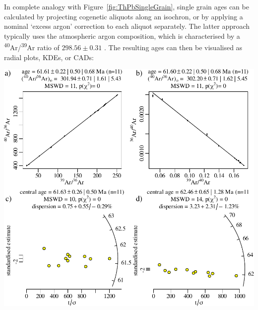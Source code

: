 \begin{refsection}
In complete analogy with Figure~\ref{fig:ThPbSingleGrain}, single
grain ages can be calculated by projecting cogenetic aliquots along an
isochron, or by applying a nominal `excess argon' correction to each
aliquot separately. The latter approach typically uses the atmospheric
argon composition, which is characterised by a
\textsuperscript{40}Ar/\textsuperscript{39}Ar ratio of
$298.56\pm{0.31}$ \citep{lee2006}. The resulting ages can then be
visualised as radial plots, KDEs, or CADs:\\

\noindent\begin{minipage}[t][][b]{.7\linewidth}
\includegraphics[width=\textwidth]{../figures/ArAr.pdf}
\end{minipage}
\begin{minipage}[t][][t]{.3\linewidth}
  \label{fig:radialArArisochron}
\end{minipage}


\end{refsection}
